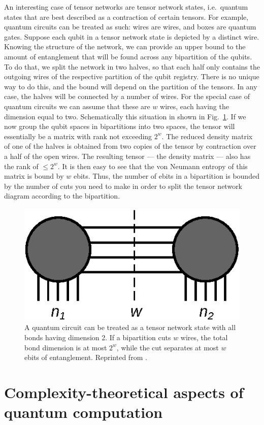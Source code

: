 An interesting case of tensor networks are tensor network states, i.e.~quantum states that are best described as a contraction of certain tensors. For example, quantum circuits can be treated as such: wires are wires, and boxes are quantum gates. Suppose each qubit in a tensor network state is depicted by a distinct wire. Knowing the structure of the network, we can provide an upper bound to the amount of entanglement that will be found across any bipartition of the qubits. To do that, we split the network in two halves, so that each half only contains the outgoing wires of the respective partition of the qubit registry. There is no unique way to do this, and the bound will depend on the partition of the tensors. In any case, the halves will be connected by a number of wires. For the special case of quantum circuits we can assume that these are $w$ wires, each having the dimension equal to two. Schematically this situation in shown in Fig.~\ref{fig:cut}. If we now group the qubit spaces in bipartitions into two spaces, the tensor will essentially be a matrix with rank not exceeding $2^w$. The reduced density matrix of one of the halves is obtained from two copies of the tensor by contraction over a half of the open wires. The resulting tensor --- the density matrix --- also has the rank of $\leq 2^w$. It is then easy to see that the von Neumann entropy of this matrix is bound by $w$ ebits. Thus, the number of ebits in a bipartition is bounded by the number of cuts you need to make in order to split the tensor network diagram according to the bipartition.

\begin{figure}
    \centering
    \includegraphics[width=0.5\linewidth]{figures/drawing_2.eps}
    \caption{A quantum circuit can be treated as a tensor network state with all bonds having dimension 2. If a bipartition cuts $w$ wires, the total bond dimension is at most $2^w$, while the cut separates at most $w$ ebits of entanglement. Reprinted from \cite{uvarov_machine_2020}.}
    \label{fig:cut}
\end{figure}

\section{Complexity-theoretical aspects of quantum computation}

